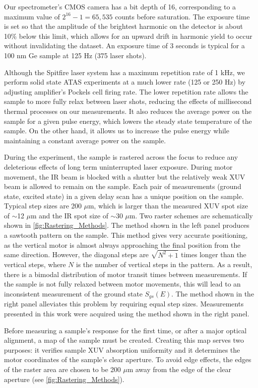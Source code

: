 Our spectrometer's CMOS camera has a bit depth of 16, corresponding to a maximum value of $2^{16}-1 = 65,535$ counts before saturation. The exposure time is set so that the amplitude of the brightest harmonic on the detector is about 10\% below this limit, which allows for an upward drift in harmonic yield to occur without invalidating the dataset. An exposure time of 3 seconds is typical for a 100 nm Ge sample at 125 Hz (375 laser shots).

Although the Spitfire laser system has a maximum repetition rate of 1 kHz, we perform solid state ATAS experiments at a much lower rate (125 or 250 Hz) by adjusting amplifier's Pockels cell firing rate. The lower repetition rate allows the sample to more fully relax between laser shots, reducing the effects of millisecond thermal processes on our measurements. It also reduces the average power on the sample for a given pulse energy, which lowers the steady state temperature of the sample. On the other hand, it allows us to increase the pulse energy while maintaining a constant average power on the sample.

During the experiment, the sample is rastered across the focus to reduce any deleterious effects of long term uninterrupted laser exposure. During motor movement, the IR beam is blocked with a shutter but the relatively weak XUV beam is allowed to remain on the sample. Each pair of measurements (ground state, excited state) in a given delay scan has a unique position on the sample. Typical step sizes are 200 $\mu$m, which is larger than the measured XUV spot size of $\sim$12 $\mu$m and the IR spot size of $\sim$30 $\mu$m. Two raster schemes are schematically shown in \cref{fig:Rastering_Methods}. The method shown in the left panel produces a sawtooth pattern on the sample. This method gives very accurate positioning, as the vertical motor is almost always approaching the final position from the same direction. However, the diagonal steps are $\sqrt{N^2+1}$ times longer than the vertical steps, where $N$ is the number of vertical steps in the pattern. As a result, there is a bimodal distribution of motor transit times between measurements. If the sample is not fully relaxed between motor movements, this will lead to an inconsistent measurement of the ground state $S_{gs}(E)$. The method shown in the right panel alleviates this problem by requiring equal step sizes. Measurements presented in this work were acquired using the method shown in the right panel.

Before measuring a sample's response for the first time, or after a major optical alignment, a map of the sample must be created. Creating this map serves two purposes: it verifies sample XUV absorption uniformity and it determines the motor coordinates of the sample's clear aperture. To avoid edge effects, the edges of the raster area are chosen to be 200 $\mu$m away from the edge of the clear aperture (see \cref{fig:Rastering_Methods}).

